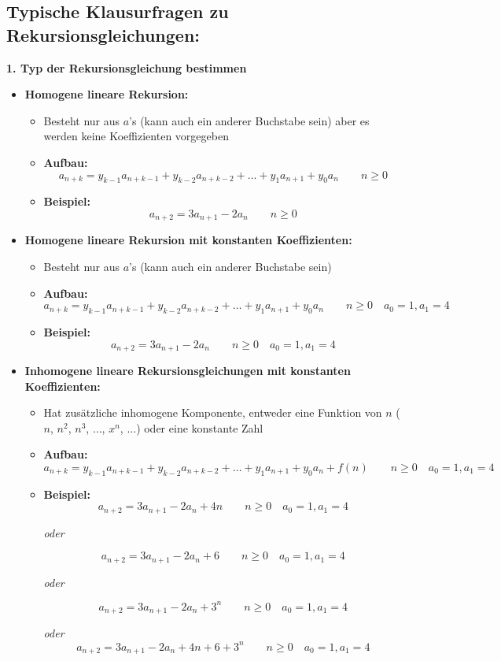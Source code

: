 \subsection{Typische Klausurfragen zu Rekursionsgleichungen:}

\textbf{1. Typ der Rekursionsgleichung bestimmen}

\begin{itemize}
\item \textbf{Homogene lineare Rekursion:}
\begin{itemize}
\item Besteht nur aus $a$'s (kann auch ein anderer Buchstabe sein) aber es werden keine Koeffizienten vorgegeben
\item \textbf{Aufbau:} $$a_{n+k} = y_{k-1}a_{n+k-1} + y_{k-2}a_{n+k-2} + \dots + y_{1}a_{n+1} + y_{0}a_{n} \qquad n \geq 0$$
\item \textbf{Beispiel:} $$a_{n+2} = 3a_{n+1} - 2a_n \qquad n \geq 0$$
\end{itemize}
\item \textbf{Homogene lineare Rekursion mit konstanten Koeffizienten:}
\begin{itemize}
\item Besteht nur aus $a$'s (kann auch ein anderer Buchstabe sein)
\item \textbf{Aufbau:} $$a_{n+k} = y_{k-1}a_{n+k-1} + y_{k-2}a_{n+k-2} + \dots + y_{1}a_{n+1} + y_{0}a_{n} \qquad n \geq 0 \quad a_0 = 1, a_1 = 4$$
\item \textbf{Beispiel:} $$a_{n+2} = 3a_{n+1} - 2a_n \qquad n \geq 0 \quad a_0 = 1, a_1 = 4$$
\end{itemize}
\item \textbf{Inhomogene lineare Rekursionsgleichungen mit konstanten Koeffizienten:}
\begin{itemize}
\item Hat zusätzliche inhomogene Komponente, entweder eine Funktion von $n$ ($n$, $n^2$, $n^3$, $\dots$, $x^n$, $\dots$) oder eine konstante Zahl
\item \textbf{Aufbau:} $$a_{n+k} = y_{k-1}a_{n+k-1} + y_{k-2}a_{n+k-2} + \dots + y_{1}a_{n+1} + y_{0}a_{n} + f(n) \qquad n \geq 0 \quad a_0 = 1, a_1 = 4$$
\item \textbf{Beispiel:} $$a_{n+2} = 3a_{n+1} - 2a_n + 4n \qquad n \geq 0 \quad a_0 = 1, a_1 = 4$$ \begin{center}\textit{oder}
\end{center} $$a_{n+2} = 3a_{n+1} - 2a_n + 6 \qquad n \geq 0 \quad a_0 = 1, a_1 = 4$$ \begin{center}\textit{oder}
\end{center} $$a_{n+2} = 3a_{n+1} - 2a_n + 3^n \qquad n \geq 0 \quad a_0 = 1, a_1 = 4$$ \begin{center}\textit{oder}  $$a_{n+2} = 3a_{n+1} - 2a_n + 4n + 6 + 3^n \qquad n \geq 0 \quad a_0 = 1, a_1 = 4$$
\end{center}
\end{itemize}
\end{itemize}\

